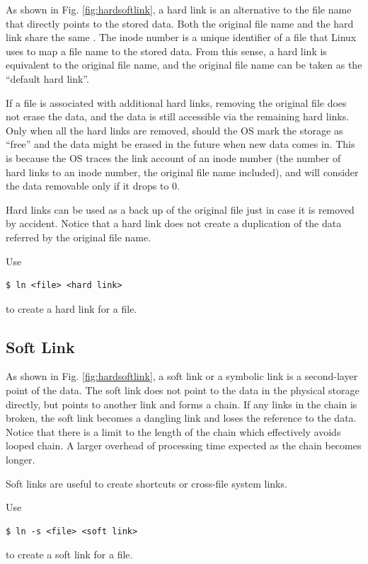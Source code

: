 As shown in Fig. \ref{fig:hardsoftlink}, a hard link is an alternative to the file name that directly points to the stored data. Both the original file name and the hard link share the same . The inode number is a unique identifier of a file that Linux uses to map a file name to the stored data. From this sense, a hard link is equivalent to the original file name, and the original file name can be taken as the ``default hard link''.

If a file is associated with additional hard links, removing the original file does not erase the data, and the data is still accessible via the remaining hard links. Only when all the hard links are removed, should the OS mark the storage as ``free'' and the data might be erased in the future when new data comes in. This is because the OS traces the link account of an inode number (the number of hard links to an inode number, the original file name included), and will consider the data removable only if it drops to 0.

Hard links can be used as a back up of the original file just in case it is removed by accident. Notice that a hard link does not create a duplication of the data referred by the original file name. 

Use
\begin{lstlisting}
$ ln <file> <hard link>
\end{lstlisting}
to create a hard link for a file.

\subsection{Soft Link}

As shown in Fig. \ref{fig:hardsoftlink}, a soft link or a symbolic link is a second-layer point of the data. The soft link does not point to the data in the physical storage directly, but points to another link and forms a chain. If any links in the chain is broken, the soft link becomes a dangling link and loses the reference to the data. Notice that there is a limit to the length of the chain which effectively avoids looped chain. A larger overhead of processing time expected as the chain becomes longer.

Soft links are useful to create shortcuts or cross-file system links.

Use
\begin{lstlisting}
$ ln -s <file> <soft link>
\end{lstlisting}
to create a soft link for a file.

